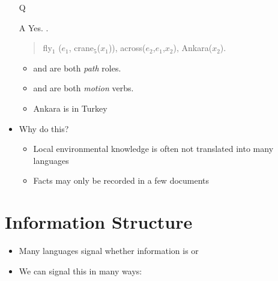 \documentclass[headrule,footrule]{foils}
\begin{document}
\MyLogo{}
\begin{itemize}
\item[Q] 
\item[A] Yes.  .
  \begin{quote}
    \large   fly$_1$ ($e_1$, crane$_5$($x_1$)),  across($e_2$,$e_1$,$x_2$), Ankara($x_2$).
  \end{quote}
  \begin{itemize}
  \item  {} and  are both \textit{path} roles.
  \item {} and  are both \textit{motion} verbs.
  \item Ankara is in Turkey
  \end{itemize}
\item Why do this?
  \begin{itemize}
  \item Local environmental knowledge is often not translated into many languages
  \item Facts may only be recorded in a few documents
\end{itemize}
\end{itemize}


\section{Information Structure}

\begin{itemize}
\item Many languages signal whether information is  or 

\item We can signal this in many ways:
  \begin{exe}
      \ex {}
      \ex
      \begin{xlist}
        \ex {}
        \ex {}
        \ex {}
        \ex {}
        \ex {}
        \ex {}
      \end{xlist}
  \end{exe}
\end{itemize}
\end{document}
